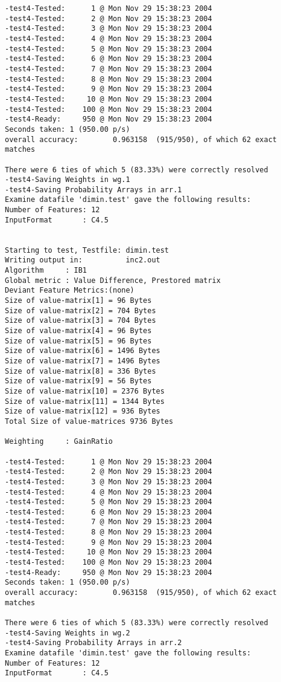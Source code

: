 \begin{footnotesize}
\begin{verbatim}
-test4-Tested:      1 @ Mon Nov 29 15:38:23 2004
-test4-Tested:      2 @ Mon Nov 29 15:38:23 2004
-test4-Tested:      3 @ Mon Nov 29 15:38:23 2004
-test4-Tested:      4 @ Mon Nov 29 15:38:23 2004
-test4-Tested:      5 @ Mon Nov 29 15:38:23 2004
-test4-Tested:      6 @ Mon Nov 29 15:38:23 2004
-test4-Tested:      7 @ Mon Nov 29 15:38:23 2004
-test4-Tested:      8 @ Mon Nov 29 15:38:23 2004
-test4-Tested:      9 @ Mon Nov 29 15:38:23 2004
-test4-Tested:     10 @ Mon Nov 29 15:38:23 2004
-test4-Tested:    100 @ Mon Nov 29 15:38:23 2004
-test4-Ready:     950 @ Mon Nov 29 15:38:23 2004
Seconds taken: 1 (950.00 p/s)
overall accuracy:        0.963158  (915/950), of which 62 exact matches 

There were 6 ties of which 5 (83.33%) were correctly resolved
-test4-Saving Weights in wg.1
-test4-Saving Probability Arrays in arr.1
Examine datafile 'dimin.test' gave the following results:
Number of Features: 12
InputFormat       : C4.5


Starting to test, Testfile: dimin.test
Writing output in:          inc2.out
Algorithm     : IB1
Global metric : Value Difference, Prestored matrix
Deviant Feature Metrics:(none)
Size of value-matrix[1] = 96 Bytes 
Size of value-matrix[2] = 704 Bytes 
Size of value-matrix[3] = 704 Bytes 
Size of value-matrix[4] = 96 Bytes 
Size of value-matrix[5] = 96 Bytes 
Size of value-matrix[6] = 1496 Bytes 
Size of value-matrix[7] = 1496 Bytes 
Size of value-matrix[8] = 336 Bytes 
Size of value-matrix[9] = 56 Bytes 
Size of value-matrix[10] = 2376 Bytes 
Size of value-matrix[11] = 1344 Bytes 
Size of value-matrix[12] = 936 Bytes 
Total Size of value-matrices 9736 Bytes 

Weighting     : GainRatio

-test4-Tested:      1 @ Mon Nov 29 15:38:23 2004
-test4-Tested:      2 @ Mon Nov 29 15:38:23 2004
-test4-Tested:      3 @ Mon Nov 29 15:38:23 2004
-test4-Tested:      4 @ Mon Nov 29 15:38:23 2004
-test4-Tested:      5 @ Mon Nov 29 15:38:23 2004
-test4-Tested:      6 @ Mon Nov 29 15:38:23 2004
-test4-Tested:      7 @ Mon Nov 29 15:38:23 2004
-test4-Tested:      8 @ Mon Nov 29 15:38:23 2004
-test4-Tested:      9 @ Mon Nov 29 15:38:23 2004
-test4-Tested:     10 @ Mon Nov 29 15:38:23 2004
-test4-Tested:    100 @ Mon Nov 29 15:38:23 2004
-test4-Ready:     950 @ Mon Nov 29 15:38:23 2004
Seconds taken: 1 (950.00 p/s)
overall accuracy:        0.963158  (915/950), of which 62 exact matches 

There were 6 ties of which 5 (83.33%) were correctly resolved
-test4-Saving Weights in wg.2
-test4-Saving Probability Arrays in arr.2
Examine datafile 'dimin.test' gave the following results:
Number of Features: 12
InputFormat       : C4.5



\end{verbatim}
\end{footnotesize}

